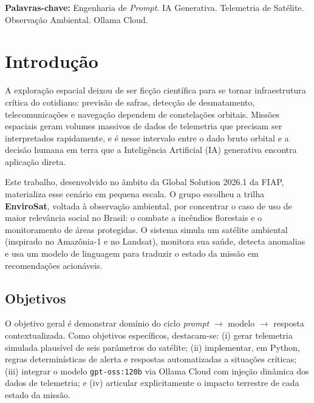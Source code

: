 \documentclass[12pt,a4paper]{article}
\begin{document}
\vspace{0.4cm}
\noindent\textbf{Palavras-chave:} Engenharia de \textit{Prompt}. IA Generativa. Telemetria de Satélite. Observação Ambiental. Ollama Cloud.

\newpage

\renewcommand{\contentsname}{SUMÁRIO}
\tableofcontents
\newpage

\section{Introdução}

A exploração espacial deixou de ser ficção científica para se tornar infraestrutura crítica do cotidiano: previsão de safras, detecção de desmatamento, telecomunicações e navegação dependem de constelações orbitais. Missões espaciais geram volumes massivos de dados de telemetria que precisam ser interpretados rapidamente, e é nesse intervalo entre o dado bruto orbital e a decisão humana em terra que a Inteligência Artificial (IA) generativa encontra aplicação direta.

Este trabalho, desenvolvido no âmbito da Global Solution 2026.1 da FIAP, materializa esse cenário em pequena escala. O grupo escolheu a trilha \textbf{EnviroSat}, voltada à observação ambiental, por concentrar o caso de uso de maior relevância social no Brasil: o combate a incêndios florestais e o monitoramento de áreas protegidas. O sistema simula um satélite ambiental (inspirado no Amazônia-1 e no Landsat), monitora sua saúde, detecta anomalias e usa um modelo de linguagem para traduzir o estado da missão em recomendações acionáveis.

\subsection{Objetivos}

O objetivo geral é demonstrar domínio do ciclo \textit{prompt} $\rightarrow$ modelo $\rightarrow$ resposta contextualizada. Como objetivos específicos, destacam-se: (i) gerar telemetria simulada plausível de seis parâmetros do satélite; (ii) implementar, em Python, regras determinísticas de alerta e respostas automatizadas a situações críticas; (iii) integrar o modelo \texttt{gpt-oss:120b} via Ollama Cloud com injeção dinâmica dos dados de telemetria; e (iv) articular explicitamente o impacto terrestre de cada estado da missão.
\end{document}
